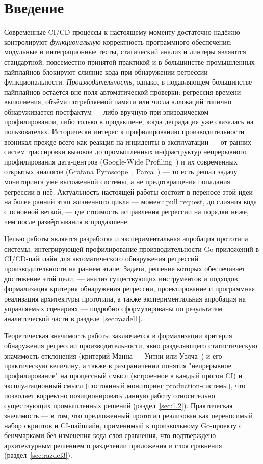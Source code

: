\section*{Введение}

Современные CI/CD-процессы к настоящему моменту достаточно надёжно
контролируют \emph{функциональную} корректность программного обеспечения:
модульные и интеграционные тесты, статический анализ и линтеры являются
стандартной, повсеместно принятой практикой и в большинстве промышленных
пайплайнов блокируют слияние кода при обнаружении регрессии
функциональности. \emph{Производительность}, однако, в подавляющем
большинстве пайплайнов остаётся вне поля автоматической проверки:
регрессия времени выполнения, объёма потребляемой памяти или числа
аллокаций типично обнаруживается постфактум — либо вручную при
эпизодическом профилировании, либо только в продакшене, когда деградация
уже сказалась на пользователях. Исторически интерес к профилированию
производительности возникал прежде всего как реакция на инциденты в
эксплуатации — от ранних систем трассировки вызовов до промышленных
инфраструктур непрерывного профилирования дата-центров (Google-Wide
Profiling~\cite{ren2010}) и их современных открытых аналогов (Grafana
Pyroscope~\cite{pyroscope-doc}, Parca~\cite{parca-doc}) — то есть решал
задачу мониторинга уже выложенной системы, а не предотвращения попадания
регрессии в неё. Актуальность настоящей работы состоит в переносе этой
идеи на более ранний этап жизненного цикла — момент pull request, до
слияния кода с основной веткой, — где стоимость исправления регрессии на
порядки ниже, чем после развёртывания в продакшене.

Целью работы является разработка и экспериментальная апробация прототипа
системы, интегрирующей профилирование производительности Go-приложений в
CI/CD-пайплайн для автоматического обнаружения регрессий производительности
на раннем этапе. Задачи, решение которых обеспечивает достижение этой
цели, — анализ существующих инструментов и подходов, формализация
критерия обнаружения регрессии, проектирование и программная реализация
архитектуры прототипа, а также экспериментальная апробация на управляемых
сценариях — подробно сформулированы по результатам аналитической части в
разделе~\ref{sec:razdel1}.

Теоретическая значимость работы заключается в формализации критерия
обнаружения регрессии производительности, явно разделяющего
статистическую значимость отклонения (критерий Манна --- Уитни или
Уэлча~\cite{welch1947}) и его практическую величину, а также в
разграничении понятия "непрерывное профилирование" на процессный смысл
(встроенное в каждый прогон CI) и эксплуатационный смысл (постоянный
мониторинг production-системы), что позволяет корректно позиционировать
данную работу относительно существующих промышленных решений
(раздел~\ref{sec:1.2}). Практическая значимость — в том, что предложенный
прототип реализован как переносимый набор скриптов и CI-пайплайн,
применимый к произвольному Go-проекту с бенчмарками без изменения кода
слоя сравнения, что подтверждено архитектурным решением о разделении
приложения и слоя сравнения (раздел~\ref{sec:razdel3}).

